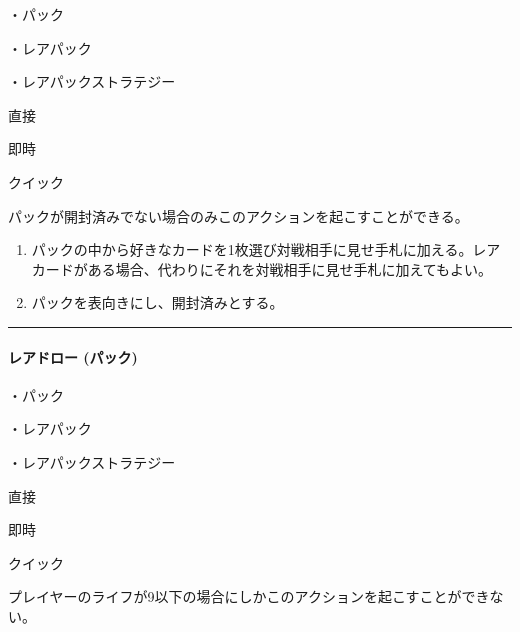 \documentclass[letterpaper,10pt,dvipdfmx]{sphinxmanual}
\begin{document}
\sphinxAtStartPar
・パック

\sphinxAtStartPar
・レアパック

\sphinxAtStartPar
・レアパックストラテジー

\sphinxAtStartPar
{} 直接

\sphinxAtStartPar
{} 即時

\sphinxAtStartPar
{} クイック

\sphinxAtStartPar
{}

\sphinxAtStartPar
パックが開封済みでない場合のみこのアクションを起こすことができる。

\sphinxAtStartPar
{}
\begin{enumerate}
%
\item {} 
\sphinxAtStartPar
パックの中から好きなカードを1枚選び対戦相手に見せ手札に加える。レアカードがある場合、代わりにそれを対戦相手に見せ手札に加えてもよい。

\item {} 
\sphinxAtStartPar
パックを表向きにし、開封済みとする。

\end{enumerate}


\bigskip\hrule\bigskip



\paragraph{レアドロー (パック)}
\label{\detokenize{auto/frameActionlist:act-raredraw}}\label{\detokenize{auto/frameActionlist:id4}}
\sphinxAtStartPar
{}

\sphinxAtStartPar
・パック

\sphinxAtStartPar
・レアパック

\sphinxAtStartPar
・レアパックストラテジー

\sphinxAtStartPar
{} 直接

\sphinxAtStartPar
{} 即時

\sphinxAtStartPar
{} クイック

\sphinxAtStartPar
{}

\sphinxAtStartPar
プレイヤーのライフが9以下の場合にしかこのアクションを起こすことができない。

\sphinxAtStartPar
{}
\end{document}
